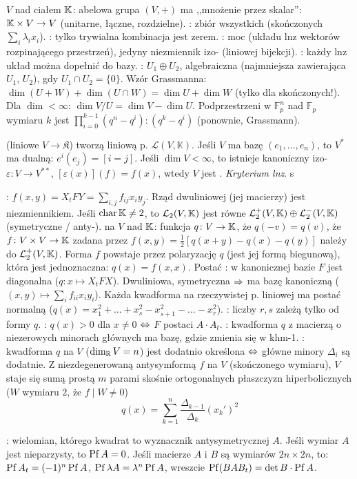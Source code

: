 $V$  nad ciałem $\mathbb{K}$: abelowa grupa $(V, +)$ ma ,,mnożenie przez skalar'': $\mathbb{K} \times V \to V$ (unitarne, łączne, rozdzielne).
: zbiór wszystkich  (skończonych $\sum_i \lambda_i x_i$).
:  tylko trywialna kombinacja jest zerem. 
: moc  (układu lnz wektorów rozpinającego przestrzeń), jedyny niezmiennik izo- (liniowej bijekcji).
: każdy lnz układ można dopełnić do bazy.
: $U_1 \oplus U_2$, algebraiczna (najmniejsza zawierająca $U_1$, $U_2$), gdy $U_1 \cap U_2 = \{0\}$.
Wzór Grassmanna: $\dim (U+W) + \dim (U \cap W) = \dim U + \dim W$ (tylko dla skończonych!).
Dla $\dim < \infty$: $\dim V / U = \dim V - \dim U$.
Podprzestrzeni w $\mathbb F_p^n$ nad $\mathbb F_p$ wymiaru $k$ jest $\prod_{i = 0}^{k-1} (q^n - q^i) : (q^k - q^i)$ (ponownie, Grassmann).

  (liniowe $V \to \mathfrak K$) tworzą liniową p.  $\mathcal L(V, \mathbb K)$.
Jeśli $V$ ma bazę $(e_1, \dots, e_n)$, to $V^*$ ma dualną: $e^i(e_j) = [i=j]$.
Jeśli $\dim V <\infty$, to istnieje kanoniczny izo- $\varepsilon \colon V \to V^{**}$, $[\varepsilon(x)](f) = f(x)$, wtedy $V$ jest .
\emph{Kryterium lnz}. s %

:  $f(x,y) = X_t F Y =  \sum_{i,j} f_{ij} x_iy_j$.
Rząd dwuliniowej (jej macierzy) jest niezmiennikiem.
Jeśli $\operatorname{char} \mathbb{K} \neq 2$, to $\mathcal L_2(V, \mathbb{K})$ jest równe $\mathcal L_2^+(V, \mathbb{K}) \oplus \mathcal L_2^-(V, \mathbb{K})$ (symetryczne / anty-).
 na $V$ nad $\mathbb{K}$: funkcja $q \colon V \to \mathbb{K}$, że $q(-v) = q(v)$, że $f \colon V \times V \to \mathbb{K}$ zadana przez $f(x,y) = \frac 12 [q(x+y)-q(x)-q(y)]$ należy do $\mathcal L_2^+(V, \mathbb{K})$.
Forma $f$ powstaje przez polaryzację $q$ (jest jej formą biegunową), która jest jednoznaczna: $q(x) = f(x, x)$.
Postać : w kanonicznej bazie $F$ jest diagonalna ($q \colon x \mapsto X_t F X$).
Dwuliniowa, symetryczna $\Rightarrow$ ma bazę kanoniczną ($(x,y) \mapsto \sum_i f_{ii} x_i y_i$).
Każda kwadforma na rzeczywistej p. liniowej ma postać normalną ($q(x) = x_1^2+\dots+x_s^2 - x_{s+1}^2- \dots - x_r^2$).
: liczby $r, s$ zależą tylko od formy $q$.
: $q(x) > 0$ dla $x \neq 0$ $\Leftrightarrow$ $F$ postaci $A \cdot A_t$.
: kwadforma $q$ z macierzą o niezerowych minorach głównych ma bazę, gdzie zmienia się w khm-1.
: kwadforma $q$ na $V$ ($\dim_{\mathbb{R}} V = n$) jest dodatnio określona $\Leftrightarrow$ główne minory $\Delta_i$ są dodatnie.
Z niezdegenerowaną antysymformą $f$ na $V$ (skończonego wymiaru), $V$ staje się sumą prostą $m$ parami skośnie ortogonalnych płaszczyzn hiperbolicznych ($W$ wymiaru $2$, że $f \mid W \neq 0$)
\[
	q(x) = \sum_{k=1}^n \frac{\Delta_{k-1}}{\Delta_k} (x_k')^2
\]

: wielomian, którego kwadrat to wyznacznik antysymetrycznej $A$.
Jeśli wymiar $A$ jest nieparzysty, to $\operatorname{Pf} A = 0$.
Jeśli macierze $A$ i $B$ są wymiarów $2n \times 2n$, to: 
$\operatorname{Pf} A_t = (-1)^n \operatorname{Pf} A$, $\operatorname{Pf} \lambda A = \lambda^n \operatorname{Pf} A$, wreszcie $\operatorname{Pf} (BAB_t)=\det B \cdot \operatorname{Pf} A$.